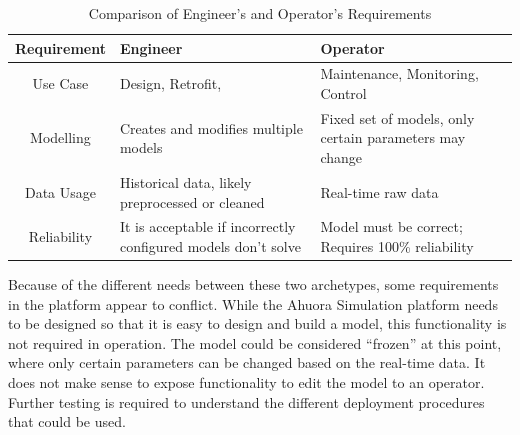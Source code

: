 \begin{table}[ht]
    \centering
    \caption{Comparison of Engineer's and Operator's Requirements}
    \begin{tabular}{|c|p{}|p{}|}
        \hline
        \textbf{Requirement} & \textbf{Engineer} & \textbf{Operator} \\
        \hline
        Use Case & Design, Retrofit, & Maintenance, Monitoring, Control \\
        \hline
        Modelling & Creates and modifies multiple models & Fixed set of models, only certain parameters may change\\
        \hline
        Data Usage & Historical data, likely preprocessed or cleaned & Real-time raw data \\
        \hline
        Reliability & It is acceptable if incorrectly configured models don't solve & Model must be correct; Requires 100\% reliability \\
        \hline
    \end{tabular}
    \label{tab:requirements}
\end{table}

Because of the different needs between these two archetypes, some requirements in the platform appear to conflict. While the Ahuora Simulation platform needs to be designed so that it is easy to design and build a model, this functionality is not required in operation. The model could be considered ``frozen'' at this point, where only certain parameters can be changed based on the real-time data. It does not make sense to expose functionality to edit the model to an operator. Further testing is required to understand the different deployment procedures that could be used.









